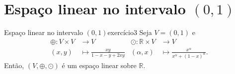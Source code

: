 \section[Espaço linear no intervalo (0,1)]{Espaço linear no intervalo \((0,1)\)}
\begin{proposition}{Espaço linear no intervalo \((0,1)\)}{exercício3}
    Seja \(V = (0,1)\) e
    \begin{align*}
        \oplus : V \times V &\to V&
        \odot : \mathbb{R} \times V &\to V\\
        (x,y) &\mapsto \frac{xy}{1 - x - y + 2xy}&
        (\alpha,x) &\mapsto \frac{x^\alpha}{x^\alpha + (1-x)^\alpha}.
    \end{align*}
    Então, \((V, \oplus, \odot)\) é um espaço linear sobre \(\mathbb{R}\).
\end{proposition}

